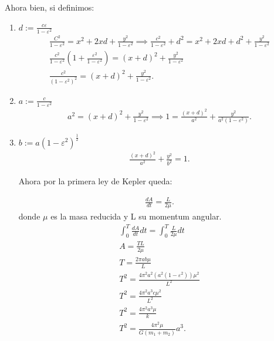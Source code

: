 \documentclass[12pt]{article}
\begin{document}
Ahora bien, si definimos:
\begin{enumerate}
  \item $d:= \frac{c\varepsilon}{1-\varepsilon^2}$ 
    \begin{align*}
      \frac{C^2}{1-\varepsilon^2} = x^2 + 2xd + \frac{y^2}{1-\varepsilon^2} \implies \frac{c^2}{1-\varepsilon^2}+d^2 = x^2 + 2xd + d^2 + \frac{y^2}{1-\varepsilon^2}\\
      \frac{c^2}{1-\varepsilon^2}\left( 1 + \frac{\varepsilon^2}{1-\varepsilon^2} \right) = \left( x+d \right)^2 + \frac{y^2}{1-\varepsilon^2}\\
      \frac{c^2}{\left( 1-\varepsilon^2 \right)^2}=\left( x+d \right)^2 + \frac{y^2}{1-\varepsilon^2}
    .\end{align*}

  \item $a := \frac{c}{1-\varepsilon^2}$ 
   \begin{align*}
     a^2 = \left( x + d \right) ^2 + \frac{y^2}{1-\varepsilon^2} \implies 1 = \frac{\left( x+d \right) ^2}{a^2}+\frac{y^2}{a^2\left( 1-\varepsilon^2 \right) }
   .\end{align*} 

 \item $b := a \left( 1-\varepsilon^2 \right)^{\frac{1}{2}}$ 
   \begin{align*}
     \frac{\left( x+d \right)^2}{a^2} + \frac{y^2}{b^2} = 1
   .\end{align*}

   Ahora por la primera ley de Kepler queda:
   
   \begin{align*}
     \frac{dA}{dt} = \frac{L}{2\mu}
   .\end{align*} donde $\mu$ es la masa reducida y L su momentum angular.
   \begin{align*}
     \int_{0}^{T}\frac{dA}{dt}dt = \int_{0}^{T}\frac{L}{2\mu}dt\\
     A = \frac{TL}{2\mu}\\
     T = \frac{2\pi a b \mu}{L}\\
     T^2 = \frac{4\pi^2 a^2\left( a^2\left( 1 - \varepsilon^2 \right)  \right) \mu^2}{L^2}\\
     T^2 = \frac{4\pi^2a^3c\mu^2}{L^2}\\
     T^2 = \frac{4\pi^2a^{3}\mu}{k}\\
     T^2 = \frac{4\pi^2\mu}{G\left( m_1+m_2 \right) }a^{3}
   .\end{align*} 


\end{enumerate}
\end{document}
